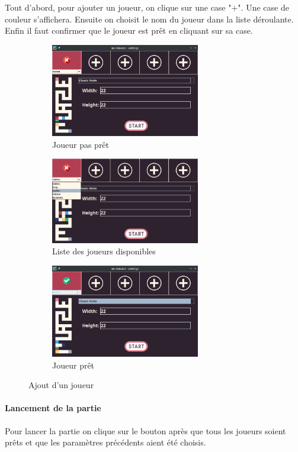 Tout d'abord, pour ajouter un joueur, on clique sur une case "+". Une case de couleur s'affichera. Ensuite on choisit le nom du joueur dans la liste déroulante. Enfin il faut confirmer que le joueur est prêt en cliquant sur sa case.

\begin{figure}[h!]
    \centering
    \begin{subfigure}{6.5cm}
        \includegraphics[width=6.5cm]{ressources/Implementation/Labyrinthe/Controleur/SettingsMenu_NotReady.png}%
        \caption{Joueur pas prêt}
        \label{fig:PlayerNotReady}
    \end{subfigure}
    \qquad
    \begin{subfigure}{6.5cm}
        \includegraphics[width=6.5cm]{ressources/Implementation/Labyrinthe/Controleur/SettingsMenu_PlayerList.png}%
        \caption{Liste des joueurs disponibles}
        \label{fig:PlayersAvailable}
    \end{subfigure}
    \qquad
    \begin{subfigure}{6.5cm}
        \includegraphics[width=6.5cm]{ressources/Implementation/Labyrinthe/Controleur/SettingsMenu_Ready.png}%
        \caption{Joueur prêt}
        \label{fig:PlayerReady}
    \end{subfigure}
    \caption{Ajout d'un joueur}
    \label{fig:PlayerSelection}
\end{figure}
\FloatBarrier

\paragraph{Lancement de la partie}

Pour lancer la partie on clique sur le bouton
après que tous les joueurs soient prêts et que les paramètres précédents aient été choisis.